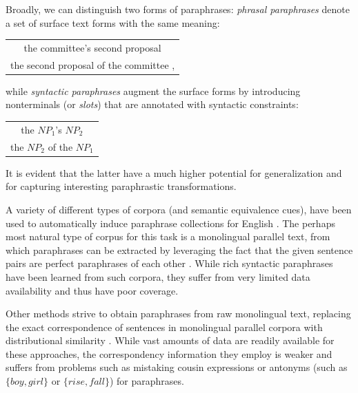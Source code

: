 \documentclass[11pt]{article}
\begin{document}
Broadly, we can distinguish two forms of paraphrases: \emph{phrasal
  paraphrases} denote a set of surface text forms with the same
meaning:
\begin{center}
\begin{tabular}{c}
the committee's second proposal \\
the second proposal of the committee ,
\end{tabular}
\end{center}
while \emph{syntactic paraphrases} augment the surface forms by
introducing nonterminals (or \emph{slots}) that are annotated with
syntactic constraints:
\begin{center}
\begin{tabular}{c}
the $\mathit{NP}_1$'s $\mathit{NP}_2$ \\
the $\mathit{NP}_2$ of the $\mathit{NP}_1$
\end{tabular}
\end{center}
It is evident that the latter have a much higher potential for
generalization and for capturing interesting paraphrastic transformations.

A variety of different types of corpora (and semantic equivalence
cues), have been used to automatically induce paraphrase collections
for English \cite{Madnani2010}. The perhaps most natural type of
corpus for this task is a monolingual parallel text, from which
paraphrases can be extracted by leveraging the fact that the given
sentence pairs are perfect paraphrases of each other
\cite{Barzilay2001,Pang2003}. While rich syntactic paraphrases have
been learned from such corpora, they suffer from very limited data
availability and thus have poor coverage.

Other methods strive to obtain paraphrases from raw monolingual text,
replacing the exact correspondence of sentences in monolingual parallel corpora with
distributional similarity \cite{Lin2001,Bhagat2008}. While
vast amounts of data are readily available for these approaches, the
correspondency information they employ is weaker and suffers from
problems such as mistaking cousin expressions or antonyms (such as
$\{\mathit{boy}, \mathit{girl}\}$ or $\{\mathit{rise},
\mathit{fall}\}$) for paraphrases.
\end{document}
